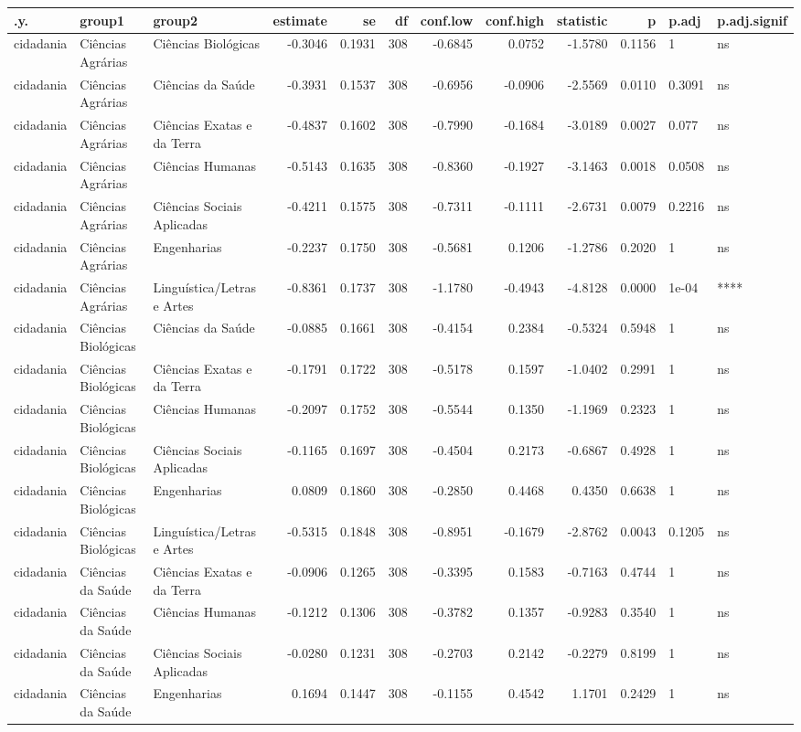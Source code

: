 \documentclass[]{article}
\begin{document}
\begin{longtable}[]{@{}lllrrrrrrrll@{}}
\toprule
.y. & group1 & group2 & estimate & se & df & conf.low & conf.high &
statistic & p & p.adj & p.adj.signif\tabularnewline
\midrule
\endhead
cidadania & Ciências Agrárias & Ciências Biológicas & -0.3046 & 0.1931 &
308 & -0.6845 & 0.0752 & -1.5780 & 0.1156 & 1 & ns\tabularnewline
cidadania & Ciências Agrárias & Ciências da Saúde & -0.3931 & 0.1537 &
308 & -0.6956 & -0.0906 & -2.5569 & 0.0110 & 0.3091 & ns\tabularnewline
cidadania & Ciências Agrárias & Ciências Exatas e da Terra & -0.4837 &
0.1602 & 308 & -0.7990 & -0.1684 & -3.0189 & 0.0027 & 0.077 &
ns\tabularnewline
cidadania & Ciências Agrárias & Ciências Humanas & -0.5143 & 0.1635 &
308 & -0.8360 & -0.1927 & -3.1463 & 0.0018 & 0.0508 & ns\tabularnewline
cidadania & Ciências Agrárias & Ciências Sociais Aplicadas & -0.4211 &
0.1575 & 308 & -0.7311 & -0.1111 & -2.6731 & 0.0079 & 0.2216 &
ns\tabularnewline
cidadania & Ciências Agrárias & Engenharias & -0.2237 & 0.1750 & 308 &
-0.5681 & 0.1206 & -1.2786 & 0.2020 & 1 & ns\tabularnewline
cidadania & Ciências Agrárias & Linguística/Letras e Artes & -0.8361 &
0.1737 & 308 & -1.1780 & -0.4943 & -4.8128 & 0.0000 & 1e-04 &
****\tabularnewline
cidadania & Ciências Biológicas & Ciências da Saúde & -0.0885 & 0.1661 &
308 & -0.4154 & 0.2384 & -0.5324 & 0.5948 & 1 & ns\tabularnewline
cidadania & Ciências Biológicas & Ciências Exatas e da Terra & -0.1791 &
0.1722 & 308 & -0.5178 & 0.1597 & -1.0402 & 0.2991 & 1 &
ns\tabularnewline
cidadania & Ciências Biológicas & Ciências Humanas & -0.2097 & 0.1752 &
308 & -0.5544 & 0.1350 & -1.1969 & 0.2323 & 1 & ns\tabularnewline
cidadania & Ciências Biológicas & Ciências Sociais Aplicadas & -0.1165 &
0.1697 & 308 & -0.4504 & 0.2173 & -0.6867 & 0.4928 & 1 &
ns\tabularnewline
cidadania & Ciências Biológicas & Engenharias & 0.0809 & 0.1860 & 308 &
-0.2850 & 0.4468 & 0.4350 & 0.6638 & 1 & ns\tabularnewline
cidadania & Ciências Biológicas & Linguística/Letras e Artes & -0.5315 &
0.1848 & 308 & -0.8951 & -0.1679 & -2.8762 & 0.0043 & 0.1205 &
ns\tabularnewline
cidadania & Ciências da Saúde & Ciências Exatas e da Terra & -0.0906 &
0.1265 & 308 & -0.3395 & 0.1583 & -0.7163 & 0.4744 & 1 &
ns\tabularnewline
cidadania & Ciências da Saúde & Ciências Humanas & -0.1212 & 0.1306 &
308 & -0.3782 & 0.1357 & -0.9283 & 0.3540 & 1 & ns\tabularnewline
cidadania & Ciências da Saúde & Ciências Sociais Aplicadas & -0.0280 &
0.1231 & 308 & -0.2703 & 0.2142 & -0.2279 & 0.8199 & 1 &
ns\tabularnewline
cidadania & Ciências da Saúde & Engenharias & 0.1694 & 0.1447 & 308 &
-0.1155 & 0.4542 & 1.1701 & 0.2429 & 1 & ns\tabularnewline

\end{longtable}
\end{document}
